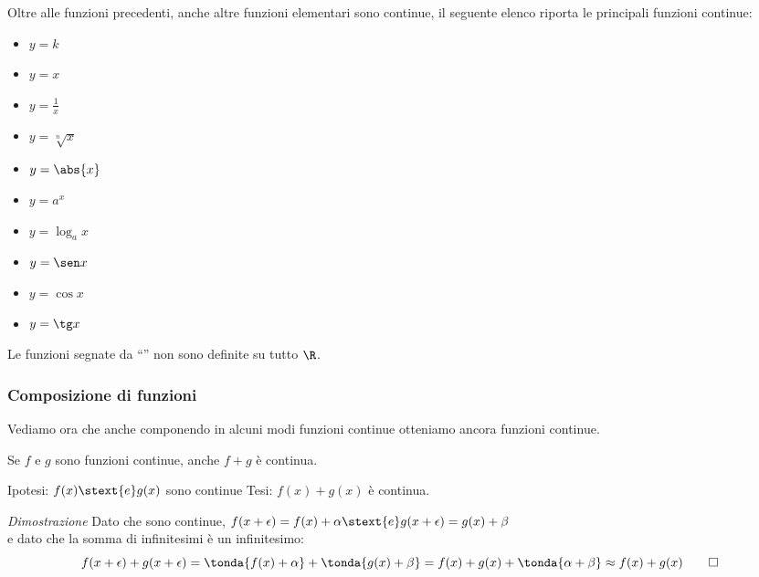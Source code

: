 \noindent\begin{minipage}{\textwidth}
Oltre alle funzioni precedenti, anche altre funzioni elementari sono 
continue, il seguente elenco riporta le principali funzioni continue:

\noindent\begin{minipage}{1.05\textwidth}
\begin{multicols}{5}
\begin{itemize} [noitemsep]
 \item \(y=k\)
 \item \(y=x\)
 \item \(y=\frac{1}{x}\)  \textasteriskcentered
 \item \(y=\sqrt[n]{x}\)  \textasteriskcentered
 \item \(y=\abs{x}\)
 \item \(y=a^x\)
 \item \(y=\log_a x\)  \textasteriskcentered
 \item \(y=\sen x\)
 \item \(y=\cos x\)
 \item \(y=\tg x\)  \textasteriskcentered
\end{itemize}
\end{multicols}
\end{minipage}

\begin{osservazione}
Le funzioni segnate da ``\textasteriskcentered'' non sono definite su 
tutto \(\R\).
\end{osservazione}
\end{minipage}

\subsubsection{Composizione di funzioni}
\label{subsubsec:cont_composizionefunzioni}

Vediamo ora che anche componendo in alcuni modi funzioni continue otteniamo 
ancora funzioni continue.

\begin{teorema}
Se \(f\) e \(g\) sono funzioni continue, anche \(f+g\) è continua.
\end{teorema}

\noindent Ipotesi: 
\(f(x) \stext{e} g(x)\) sono continue
\tab Tesi: 
\(f(x)+g(x)\) è continua.

\emph{Dimostrazione}
Dato che sono continue, 
\(f(x+\epsilon) = f(x)+\alpha \stext{ e } g(x+\epsilon) = g(x)+\beta\) \\
e dato che la somma di infinitesimi è un infinitesimo:
\[f(x+\epsilon) + g(x+\epsilon) = 
\tonda{f(x)+\alpha} + \tonda{g(x)+\beta} = 
f(x)+g(x)+\tonda{\alpha + \beta} \approx f(x)+g(x) \qed\]

